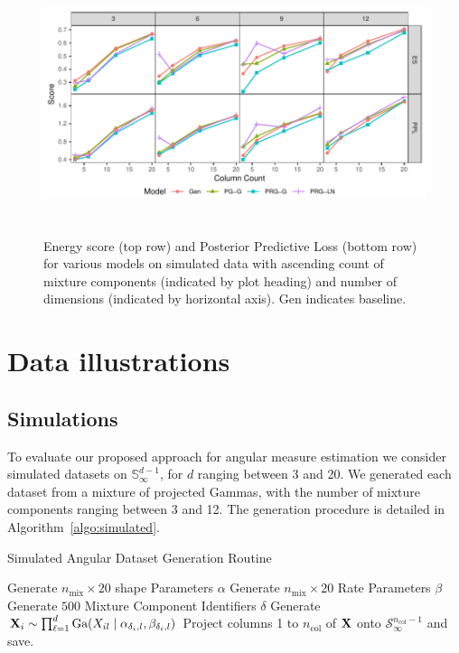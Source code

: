 
\begin{figure}[htb]
    \centering
    \caption{Energy score (top row) and Posterior Predictive Loss (bottom row) for various models on simulated data with ascending count of mixture components (indicated by plot heading) and number of dimensions (indicated by horizontal axis).  Gen indicates baseline.\label{fig:simpples}}
    \includegraphics[height=3in, width = \textwidth]{./images/simulation_score}
\end{figure}


\section{Data illustrations\label{sec:results}}

\subsection{Simulations\label{subsec:simulated}}

To evaluate our proposed approach for angular measure estimation 
    we consider simulated datasets on $\mathbb{S}_{\infty}^{d-1}$, for 
    $d$ ranging between 3 and 20. We generated each dataset from a mixture of projected Gammas, with 
    the number of mixture components ranging between 3 and 12.  The generation procedure is detailed 
    in Algorithm~\ref{algo:simulated}.
    \begin{algorithm}[ht]  %
        \caption{Simulated Angular Dataset Generation Routine\label{algo:simulated}}
        \begin{algorithmic}
            \State Generate $n_{\text{mix}} \times 20$ shape Parameters $\alpha$
            \State Generate $n_{\text{mix}} \times 20$ Rate Parameters $\beta$
            \State Generate $500$ Mixture Component Identifiers $\delta$
                \State Generate ${\bf X}_i \sim \prod_{\ell = 1}^d\text{Ga}\left(X_{il}\mid\alpha_{\delta_i,l},\beta_{\delta_i, l}\right)$
            \EndFor
                \State Project columns 1 to $n_{\text{col}}$ of ${\bf X}$ onto $\mathcal{S}_{\infty}^{n_{\text{col}} - 1}$ and save.
            \EndFor
        \EndFor
        \end{algorithmic}
    \end{algorithm}


